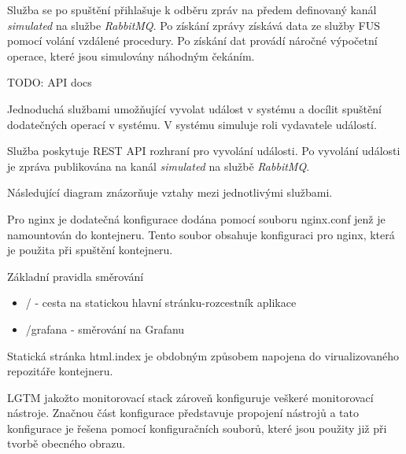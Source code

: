 Služba se po spuštění přihlašuje k odběru zpráv na předem definovaný kanál \emph{simulated} na službe \emph{RabbitMQ}. Po získání zprávy získává data ze služby FUS pomocí volání vzdálené procedury. Po získání dat provádí náročné výpočetní operace, které jsou simulovány náhodným čekáním.

TODO: API docs


Jednoduchá službami umožňující vyvolat událost v systému a docílit spuštění dodatečných operací v systému. V systému simuluje roli vydavatele událostí.

Služba poskytuje REST API rozhraní pro vyvolání události. Po vyvolání události je zpráva publikována na kanál \emph{simulated} na službě \emph{RabbitMQ}.



Následující diagram znázorňuje vztahy mezi jednotlivými službami.





Pro nginx je dodatečná konfigurace dodána pomocí souboru nginx.conf jenž je namountován do kontejneru. Tento soubor obsahuje konfiguraci pro nginx, která je použita při spuštění kontejneru.

Základní pravidla směrování

\begin{itemize}
    \item / - cesta na statickou hlavní stránku-rozcestník aplikace
    \item /grafana - směrování na Grafanu
\end{itemize}

Statická stránka html.index je obdobným způsobem napojena do virualizovaného repozitáře kontejneru.


LGTM jakožto monitorovací stack zároveň konfiguruje veškeré monitorovací nástroje. Značnou část konfigurace představuje propojení nástrojů a tato konfigurace je řešena pomocí konfiguračních souborů, které jsou použity již při tvorbě obecného obrazu.

